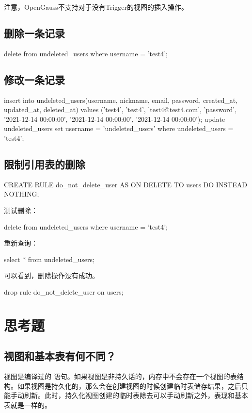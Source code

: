 \documentclass{ctexrep}
\begin{document}
注意，OpenGauss不支持对于没有Trigger的视图的插入操作。

\subsection{删除一条记录}
\begin{run}
    delete from undeleted_users where username = 'test4';
\end{run}

\subsection{修改一条记录}
\begin{run}
    insert into undeleted_users(username, nickname, email, password,  created_at, updated_at, deleted_at)
    values ('test4', 'test4', 'test4@test4.com', 'password',  '2021-12-14 00:00:00', '2021-12-14 00:00:00', '2021-12-14 00:00:00');
    update undeleted_users set username = 'undeleted_users' where undeleted_users = 'test4';
\end{run}

\subsection{限制引用表的删除}
\begin{run}
    CREATE RULE do_not_delete_user AS ON DELETE TO users DO INSTEAD NOTHING;
\end{run}
测试删除：
\begin{run}
    delete from undeleted_users where username = 'test4';
\end{run}
重新查询：
\begin{run}
    select * from undeleted_users;
\end{run}
可以看到，删除操作没有成功。
\begin{runsilent}
    drop rule do_not_delete_user on users;
\end{runsilent}
\section{思考题}
\subsection*{视图和基本表有何不同？}
视图是编译过的  语句。如果视图是非持久话的，内存中不会存在一个视图的表结构。如果视图是持久化的，那么会在创建视图的时候创建临时表储存结果，之后只能手动刷新。此时，持久化视图创建的临时表除去可以手动刷新之外，表现和基本表就是一样的。
\end{document}
